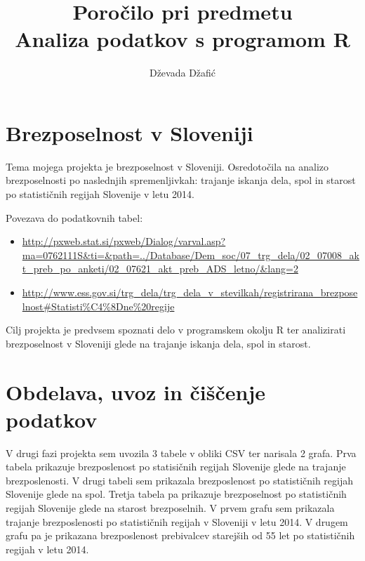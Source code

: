 \documentclass[11pt,a4paper]{article}
\begin{document}
\title{Poročilo pri predmetu \\
Analiza podatkov s programom R}
\author{Dževada Džafić}
\maketitle

\section{Brezposelnost v Sloveniji}

Tema mojega projekta je brezposelnost v Sloveniji. Osredotočila na analizo brezposelnosti po naslednjih spremenljivkah: trajanje iskanja dela, spol in starost po statističnih regijah Slovenije v letu 2014.

Povezava do podatkovnih tabel:
\begin{itemize}

\item \url{http://pxweb.stat.si/pxweb/Dialog/varval.asp?ma=0762111S&ti=&path=../Database/Dem_soc/07_trg_dela/02_07008_akt_preb_po_anketi/02_07621_akt_preb_ADS_letno/&lang=2}
\item \url{http://www.ess.gov.si/trg_dela/trg_dela_v_stevilkah/registrirana_brezposelnost#Statisti%C4%8Dne%20regije}

\end{itemize}

Cilj projekta je predvsem spoznati delo v programskem okolju R ter analizirati brezposelnost v Sloveniji glede na trajanje iskanja dela, spol in starost.


\section{Obdelava, uvoz in čiščenje podatkov}

V drugi fazi projekta sem uvozila 3 tabele v obliki CSV ter narisala 2 grafa.
Prva tabela prikazuje brezposlenost po statisičnih regijah Slovenije glede na trajanje brezposlenosti.
V drugi tabeli sem prikazala brezposlenost po statističnih regijah Slovenije glede na spol. Tretja tabela pa prikazuje brezposelnost po statističnih regijah Slovenije glede na starost brezposelnih.
V prvem grafu sem prikazala trajanje brezposlenosti po statističnih regijah v Sloveniji v letu 2014. V drugem grafu pa je prikazana brezposlenost prebivalcev starejših od 55 let po statističnih regijah v letu 2014.

\end{document}
